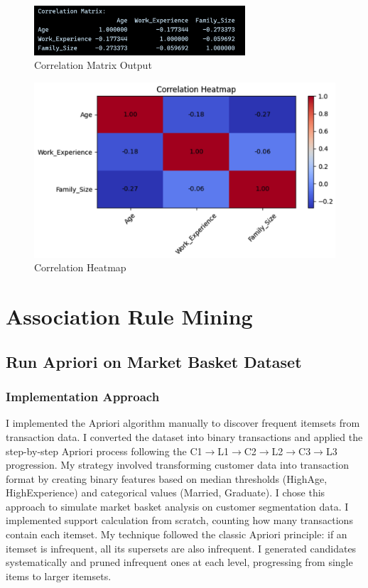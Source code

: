 \documentclass[12pt,a4paper]{article}
\begin{document}
\begin{figure}[h!]
    \centering
    \includegraphics[width=0.7\textwidth]{Figures/correlation_matrix_output.png}
    \caption{Correlation Matrix Output}
\end{figure}

\begin{figure}[h!]
    \centering
    \includegraphics[width=\textwidth]{Figures/correlation_heatmap.png}
    \caption{Correlation Heatmap}
\end{figure}

\section{Association Rule Mining}

\subsection{Run Apriori on Market Basket Dataset}

\subsubsection{Implementation Approach}
I implemented the Apriori algorithm manually to discover frequent itemsets from transaction data. I converted the dataset into binary transactions and applied the step-by-step Apriori process following the C1$\rightarrow$L1$\rightarrow$C2$\rightarrow$L2$\rightarrow$C3$\rightarrow$L3 progression. My strategy involved transforming customer data into transaction format by creating binary features based on median thresholds (HighAge, HighExperience) and categorical values (Married, Graduate). I chose this approach to simulate market basket analysis on customer segmentation data. I implemented support calculation from scratch, counting how many transactions contain each itemset. My technique followed the classic Apriori principle: if an itemset is infrequent, all its supersets are also infrequent. I generated candidates systematically and pruned infrequent ones at each level, progressing from single items to larger itemsets.
\end{document}
